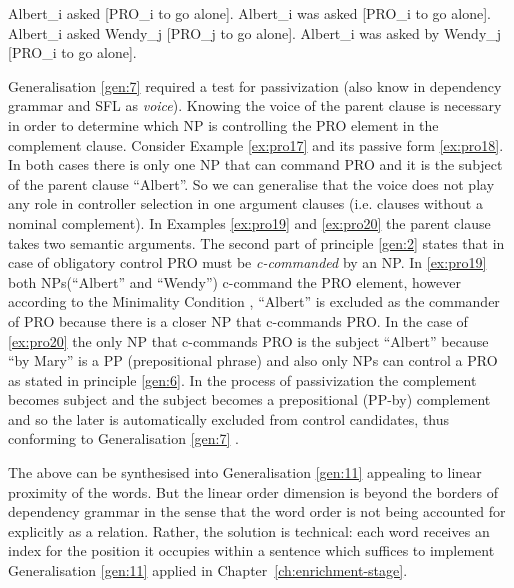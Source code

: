     \begin{exe}
    	\ex\label{ex:pro17} Albert_i asked [PRO_i to go alone].
    	\ex\label{ex:pro18} Albert_i was asked [PRO_i to go alone].
    	\ex\label{ex:pro19} Albert_i asked Wendy_j [PRO_j to go alone].
    	\ex\label{ex:pro20} Albert_i was asked by Wendy_j [PRO_i to go alone].
    \end{exe}


    Generalisation \ref{gen:7} required a test for passivization (also know in dependency grammar and SFL as \textit{voice}). Knowing the voice of the parent clause is necessary in order to determine which NP is controlling the PRO element in the complement clause. Consider Example \ref{ex:pro17} and its passive form \ref{ex:pro18}. In both cases there is only one NP that can command PRO and it is the subject of the parent clause ``Albert''. So we can generalise that the voice does not play any role in controller selection in one argument clauses (i.e. clauses without a nominal complement). In Examples \ref{ex:pro19} and \ref{ex:pro20} the parent clause takes two semantic arguments. The second part of principle \ref{gen:2} states that in case of obligatory control PRO must be \textit{c-commanded} by an NP. In \ref{ex:pro19} both NPs(``Albert'' and ``Wendy'') c-command the PRO element, however according to the Minimality Condition \citep[479]{Haegeman1991}, ``Albert'' is excluded as the commander of PRO because there is a closer NP that c-commands PRO. In the case of \ref{ex:pro20} the only NP that c-commands PRO is the subject ``Albert'' because ``by Mary'' is a PP (prepositional phrase) and also only NPs can control a PRO as stated in principle \ref{gen:6}. In the process of passivization the complement becomes subject and the subject becomes a prepositional (PP-by) complement and so the later is automatically excluded from control candidates, thus conforming to Generalisation \ref{gen:7} \citep[281]{Haegeman1991}. 

    The above can be synthesised into Generalisation \ref{gen:11} appealing to linear proximity of the words. But the linear order dimension is beyond the borders of dependency grammar in the sense that the word order is not being accounted for explicitly as a relation. Rather, the solution is technical: each word receives an index for the position it occupies within a sentence which suffices to implement Generalisation \ref{gen:11} applied in \mbox{Chapter \ref{ch:enrichment-stage}}.
    
